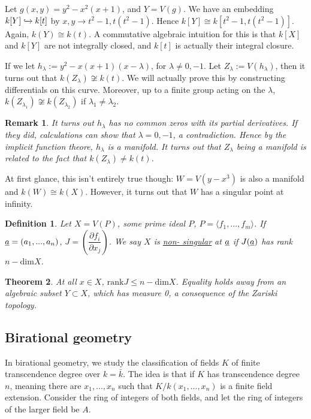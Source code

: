 \documentclass[letterpaper, 12pt]{article}
\newtheorem{rmk}{Remark}
\newtheorem{thm}{Theorem}[subsection]
\newtheorem{definition}[thm]{Definition}
\renewcommand{\dim}{\mathrm{dim}}
\newcommand{\iso}{\cong}
\begin{document}
Let $g(x,y) = y^2 - x^2(x + 1)$, and $Y = V(g)$. We have an embedding $k[Y]
\xhookrightarrow{} k[t]$ by $x, y \rightarrow t^2 - 1, t(t^2 - 1)$. Hence
$k[Y] \iso k[t^2 - 1, t(t^2 - 1)]$. Again, $k(Y) \iso k(t)$. A commutative
algebraic intuition for this is that $k[X]$ and $k[Y]$ are not integrally
closed, and $k[t]$ is actually their integral closure.

If we let $h_\lambda := y^2 - x(x + 1)(x - \lambda)$, for $\lambda \neq 0,
-1$. Let $Z_\lambda := V(h_\lambda)$, then it turns out that $k(Z_\lambda)
\not \iso k(t)$. We will actually prove this by constructing differentials on
this curve. Moreover, up to a finite group acting on the $\lambda$,
$k(Z_{\lambda_1}) \not \iso k(Z_{\lambda_2})$ if $\lambda_1 \neq \lambda_2$.

\begin{rmk} It turns out $h_\lambda$ has no common zeros with its partial
derivatives. If they did, calculations can show that $\lambda = 0, -1$, a
contradiction. Hence by the implicit function theore, $h_\lambda$ is a
manifold. It turns out that $Z_\lambda$ being a manifold is related to the
fact that $k(Z_\lambda) \neq k(t)$. \end{rmk}

At first glance, this isn't entirely true though: $W = V(y - x^3)$ is also a
manifold and $k(W) \iso k(X)$. However, it turns out that $W$ has a singular
point at infinity.

\begin{definition}   Let $X = V(P)$, some prime ideal $P$, $P = \langle f_1,
..., f_m \rangle$. If $\uline{a} = (a_1, ..., a_n)$, $J = \left(
\dfrac{\partial f_i}{\partial x_j} \right)$. We say $X$ is \uline{non-
singular} at $\uline{a}$ if $J(\uline{a})$ has rank $n - \dim X$.
\end{definition}

\begin{thm} At all $x \in X$, $\mathrm{rank} J \leq n - \dim X$. Equality
holds away from an algebraic subset $Y \subset X$, which has measure 0, a
consequence of the Zariski topology. \end{thm}

\subsection{Birational geometry} In birational geometry, we study the
classification of fields $K$ of finite transcendence degree over $k =
\bar{k}$. The idea is that if $K$ has transcendence degree $n$, meaning there
are $x_1, ..., x_n$ such that $K/k(x_1, ..., x_n)$ is a finite field
extension. Consider the ring of integers of both fields, and let the ring of
integers of the larger field be $A$.
\end{document}

